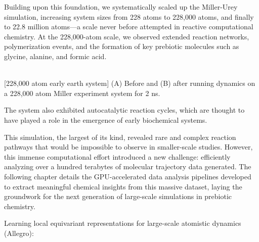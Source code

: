 Building upon this foundation, we systematically scaled up the Miller-Urey simulation, increasing system sizes from 228 atoms to 228,000 atoms, and finally to 22.8 million atoms---a scale never before attempted in reactive computational chemistry. At the 228,000-atom scale, we observed extended reaction networks, polymerization events, and the formation of key prebiotic molecules such as glycine, alanine, and formic acid. 


\begin{flushleft}
\begin{multiFigure}
     \\
[228,000 atom early earth system]{
(A) Before and (B) after running dynamics on a 228,000 atom Miller experiment system for 2 ns.
}
\label{fig:228000_atom_run}
\end{multiFigure}
\end{flushleft}

The system also exhibited autocatalytic reaction cycles, which are thought to have played a role in the emergence of early biochemical systems.

This simulation, the largest of its kind, revealed rare and complex reaction pathways that would be impossible to observe in smaller-scale studies. However, this immense computational effort introduced a new challenge: efficiently analyzing over a hundred terabytes of molecular trajectory data generated. The following chapter details the GPU-accelerated data analysis pipelines developed to extract meaningful chemical insights from this massive dataset, laying the groundwork for the next generation of large-scale simulations in prebiotic chemistry.


Learning local equivariant representations for large-scale atomistic dynamics (Allegro): \cite{allegro}



